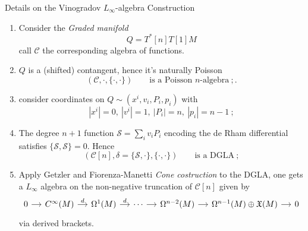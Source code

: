 \documentclass[10pt]{beamer}
\begin{document}
\begin{frame}[t,fragile,shrink=20]{Details on the Vinogradov $L_\infty$-algebra Construction}\label{frame:VinoDetails}
	\begin{enumerate}[<+-| alert@+>]
		\setlength\itemsep{2em}
		\item Consider the \emph{Graded manifold}
		 $$ Q = T^\ast[n] T[1] M $$
		 call $\mathcal{C}$ the corresponding algebra of functions.
		\item $Q$ is a (shifted) contangent, hence it's naturally Poisson
		 $$ (\mathcal{C},\cdot,\{\cdot,\cdot\}) \qquad \text{is a Poisson $n$-algebra}~;.$$
		\item consider coordinates on $Q\sim (x^i,v_i, P_i, p_i)$ with
			$$ |x^i|=0,~ |v^i|=1,~ |P_i|=n, ~ |p_i|=n-1 ~;$$
		\item The degree $n+1$ function $\mathcal{S}= \sum_i v_i P_i$ encoding the de Rham differential satisfies
			$\{\mathcal{S},\mathcal{S}\}=0$. Hence
			 $$ (\mathcal{C}[n],\delta=\{\mathcal{S},\cdot\},\{\cdot,\cdot\}) \qquad \text{is a DGLA}~;$$
		\item Apply Getzler \cite{Getzler1991} and Fiorenza-Manetti \cite{Fiorenza2006}  \emph{Cone costruction} to the DGLA, one gets a $L_\infty$ algebra on the non-negative truncation of $\mathcal{C}[n]$ given by
		\begin{displaymath}
			\begin{tikzcd}[column sep= small,row sep=small]
				0 \ar[r,] & C^\infty(M) \ar["d",r] &
				\Omega^1(M) \ar["d",r] & \cdots \ar[r]
				& \Omega^{n-2}(M) \ar[r]& \Omega^{n-1}(M)\oplus \mathfrak{X}(M) \ar[r] & 0
			\end{tikzcd}
		\end{displaymath}			 
			via derived brackets.	
	\end{enumerate}
	\hfill {}%
\end{frame}
\end{document}
